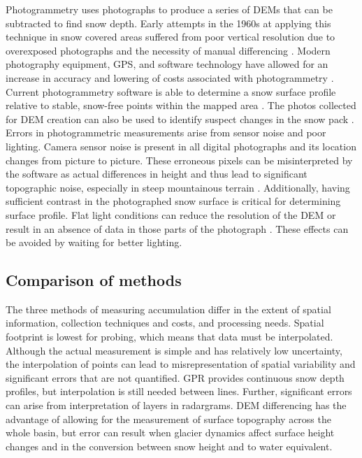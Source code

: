\documentclass{sfuthesis}
\begin{document}
Photogrammetry uses photographs to produce a series of DEMs that can be subtracted to find snow depth. Early attempts in the 1960s at applying this technique in snow covered areas suffered from poor vertical resolution due to overexposed photographs and the necessity of manual differencing \citep{Nolan2015}. Modern photography equipment, GPS, and software technology have allowed for an increase in accuracy and lowering of costs associated with photogrammetry \citep{Nolan2015}. Current photogrammetry software is able to determine a snow surface profile relative to stable, snow-free points within the mapped area \citep{Farinotti2010}. The photos collected for DEM creation can also be used to identify suspect changes in the snow pack \citep{Nolan2015}.
Errors in photogrammetric measurements arise from sensor noise and poor lighting. Camera sensor noise is present in all digital photographs and its location changes from picture to picture. These erroneous pixels can be misinterpreted by the software as actual differences in height and thus lead to significant topographic noise, especially in steep mountainous terrain \citep{Nolan2015}. Additionally, having sufficient contrast in the photographed snow surface is critical for determining surface profile. Flat light conditions can reduce the resolution of the DEM or result in an absence of data in those parts of the photograph \citep{Nolan2015}. These effects can be avoided by waiting for better lighting. 

\subsection{Comparison of methods}
\label{sec:comparemethods}
The three methods of measuring accumulation differ in the extent of spatial information, collection techniques and costs, and processing needs. Spatial footprint is lowest for probing, which means that data must be interpolated. Although the actual measurement is simple and has relatively low uncertainty, the interpolation of points can lead to misrepresentation of spatial variability and significant errors that are not quantified. GPR provides continuous snow depth profiles, but interpolation is still needed between lines. Further, significant errors can arise from interpretation of layers in radargrams. DEM differencing has the advantage of allowing for the measurement of surface topography across the whole basin, but error can result when glacier dynamics affect surface height changes and in the conversion between snow height and to water equivalent. 
\end{document}

